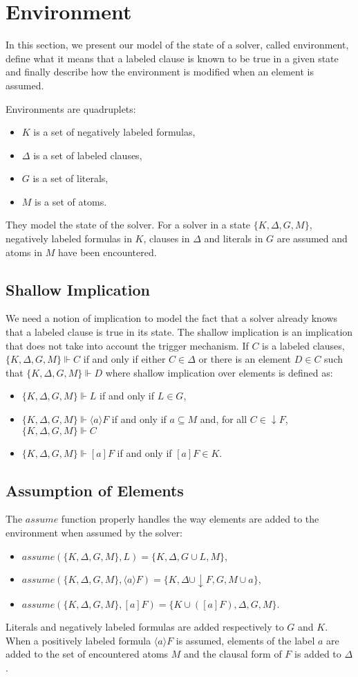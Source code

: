 \documentclass[a4paper,11pt]{article}
\newcommand{\A}{\mathit{assume}}
\begin{document}
\section{Environment}
In this section, we present our model of the state of a solver, called environment, define
what it means that a labeled clause is known to be true in a given state and finally describe how
the environment is modified when an element is assumed.
\bigskip

\noindent
Environments are quadruplets:
\begin{itemize}
 \item $K$ is a set of negatively labeled formulas,
 \item $\Delta$ is a set of labeled clauses,
 \item $G$ is a set of literals,
 \item $M$ is a set of atoms.
\end{itemize}
They model the state of the solver. For a solver in a state $\{K,\Delta,G,M\}$, negatively labeled
formulas in $K$, clauses in $\Delta$ and literals in $G$ are assumed and atoms in $M$ have been
encountered.
\subsection{Shallow Implication}
We need a notion of implication to model the fact that a solver already knows that a labeled clause
is true in its state. The shallow implication is an implication that does not take into account
the trigger mechanism. If $C$ is a labeled clauses, $\{K,\Delta,G,M\}\Vdash C$ if and only if either
$C\in\Delta$ or there is an element $D\in C$ such that $\{K,\Delta,G,M\}\Vdash D$ where shallow
implication over elements is defined as:
\begin{itemize}
 \item $\{K,\Delta,G,M\}\Vdash L$ if and only if $L\in G$,
 \item $\{K,\Delta,G,M\}\Vdash\langle a\rangle F$ if and only if $a\subseteq M$ and, 
for all $C\in\downarrow F$, $\{K,\Delta,G,M\}\Vdash C$ 
 \item $\{K,\Delta,G,M\}\Vdash[a]F$ if and only if $[a]F\in K$.
\end{itemize}
\subsection{Assumption of Elements}
The $\A$ function properly handles the way elements are added to the environment when assumed
by the solver:
\begin{itemize}
 \item $\A(\{K,\Delta,G,M\},L)=\{K,\Delta,G\cup L,M\}$,
 \item $\A(\{K,\Delta,G,M\},\langle a\rangle F)=\{K,\Delta\cup\downarrow F,G,M\cup a\}$,
 \item $\A(\{K,\Delta,G,M\},[a]F)=\{K\cup([a]F),\Delta,G,M\}$.
\end{itemize}
Literals and negatively labeled formulas are added respectively to $G$ and $K$. When a positively
labeled formula $\langle a\rangle F$ is assumed, elements of the label $a$ are added to the
set of encountered atoms $M$ and the clausal form of $F$ is added to $\Delta$.
\end{document}
